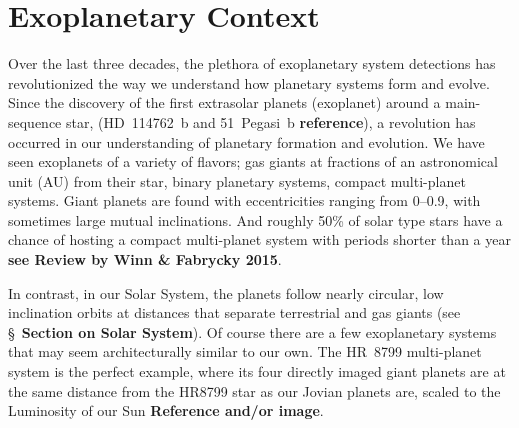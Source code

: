 \section{Exoplanetary Context}\label{sec:ch1_context}

    Over the last three decades, the plethora of exoplanetary system detections has revolutionized the way we understand how planetary systems form and evolve. Since the discovery of the first extrasolar planets (exoplanet) around a main-sequence star, (HD~114762~b and 51~Pegasi~b \textbf{reference}), a revolution has occurred in our understanding of planetary formation and evolution. We have seen exoplanets of a variety of flavors; gas giants at fractions of an astronomical unit (AU) from their star, binary planetary systems, compact multi-planet systems. Giant planets are found with eccentricities ranging from 0--0.9, with sometimes large mutual inclinations. And roughly 50\% of solar type stars have a chance of hosting a compact multi-planet system with periods shorter than a year \textbf{see Review by Winn \& Fabrycky 2015}. 
    
    In contrast, in our Solar System, the planets follow nearly circular, low inclination orbits at distances that separate terrestrial and gas giants (see \S~\textbf{Section on Solar System}). Of course there are a few exoplanetary systems that may seem architecturally similar to our own. The HR~8799 multi-planet system is the perfect example, where its four directly imaged giant planets are at the same distance from the HR8799 star as our Jovian planets are, scaled to the Luminosity of our Sun \textbf{Reference and/or image}. 
    
